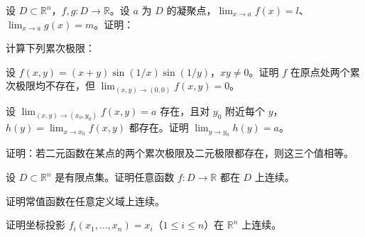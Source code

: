 \newpage
\noindent\begin{minipage}{\textwidth}
设 $D\subset\mathbb R^n$，$f,g:D\to\mathbb R$。设 $a$ 为 $D$ 的凝聚点，$\lim_{x\to a}f(x)=l$、$\lim_{x\to a}g(x)=m$。证明：
\end{minipage}\par\vfill
\noindent\begin{minipage}{\textwidth}
计算下列累次极限：
\end{minipage}\par\vfill
\noindent\begin{minipage}{\textwidth}
设 $f(x,y)=(x+y)\sin(1/x)\sin(1/y)$，$xy\ne0$。证明 $f$ 在原点处两个累次极限均不存在，但 $\lim_{(x,y)\to(0,0)}f(x,y)=0$。
\end{minipage}\par\vfill
\newpage
\noindent\begin{minipage}{\textwidth}
设 $\lim_{(x,y)\to(x_0,y_0)}f(x,y)=a$ 存在，且对 $y_0$ 附近每个 $y$，$h(y)=\lim_{x\to x_0}f(x,y)$ 都存在。证明 $\lim_{y\to y_0}h(y)=a$。
\end{minipage}\par\vfill
\noindent\begin{minipage}{\textwidth}
证明：若二元函数在某点的两个累次极限及二元极限都存在，则这三个值相等。
\end{minipage}\par\vfill
\noindent\begin{minipage}{\textwidth}
设 $D\subset\mathbb R^n$ 是有限点集。证明任意函数 $f:D\to\mathbb R$ 都在 $D$ 上连续。
\end{minipage}\par\vfill
\newpage
\noindent\begin{minipage}{\textwidth}
证明常值函数在任意定义域上连续。
\end{minipage}\par\vfill
\noindent\begin{minipage}{\textwidth}
证明坐标投影 $f_i(x_1,\ldots,x_n)=x_i$（$1\le i\le n$）在 $\mathbb R^n$ 上连续。
\end{minipage}\par\vfill
